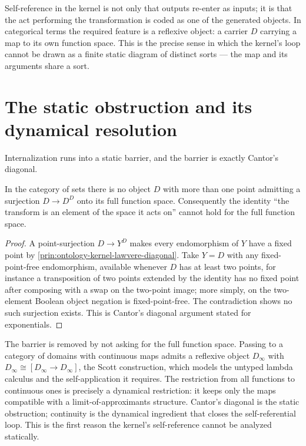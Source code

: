 \begin{principle}
\label{prin:ontology-kernel-transform-is-data}
Self-reference in the kernel is not only that outputs re-enter as inputs; it is
that the act performing the transformation is coded as one of the generated
objects.  In categorical terms the required feature is a reflexive object: a
carrier $D$ carrying a map to its own function space.  This is the precise
sense in which the kernel's loop cannot be drawn as a finite static diagram of
distinct sorts --- the map and its arguments share a sort.
\end{principle}

\section{The static obstruction and its dynamical resolution}
\label{sec:ontology-kernel-static-obstruction}

Internalization runs into a static barrier, and the barrier is exactly Cantor's
diagonal.

\begin{theorem}
\label{thm:ontology-kernel-no-static-reflexive}
In the category of sets there is no object $D$ with more than one point admitting
a surjection $D\to D^{D}$ onto its full function space.  Consequently the
identity ``the transform is an element of the space it acts on'' cannot hold for
the full function space.
\end{theorem}

\begin{proof}
A point-surjection $D\to Y^{D}$ makes every endomorphism of $Y$ have a fixed
point by \autoref{prin:ontology-kernel-lawvere-diagonal}.  Take $Y=D$ with any
fixed-point-free endomorphism, available whenever $D$ has at least two points,
for instance a transposition of two points extended by the identity has no
fixed point after composing with a swap on the two-point image; more simply, on
the two-element Boolean object negation is fixed-point-free.  The contradiction
shows no such surjection exists.  This is Cantor's diagonal argument stated for
exponentials.
\end{proof}

\begin{principle}
\label{prin:ontology-kernel-continuity-resolves}
The barrier is removed by not asking for the full function space.  Passing to a
category of domains with continuous maps admits a reflexive object $D_\infty$
with $D_\infty\cong[D_\infty\to D_\infty]$, the Scott construction, which models
the untyped lambda calculus and the self-application it requires.  The
restriction from all functions to continuous ones is precisely a dynamical
restriction: it keeps only the maps compatible with a limit-of-approximants
structure.  Cantor's diagonal is the static obstruction; continuity is the
dynamical ingredient that closes the self-referential loop.  This is the first
reason the kernel's self-reference cannot be analyzed statically.
\end{principle}

